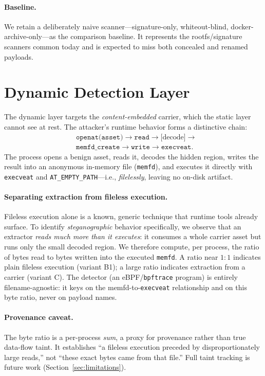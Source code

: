 \documentclass[sigconf,nonacm]{acmart}
\begin{document}
\paragraph{Baseline.} We retain a deliberately naive scanner---signature-only,
whiteout-blind, docker-archive-only---as the comparison baseline. It represents
the rootfs/signature scanners common today and is expected to miss both concealed
and renamed payloads.

\section{Dynamic Detection Layer}
\label{sec:dynamic}
The dynamic layer targets the \emph{content-embedded} carrier, which the static
layer cannot see at rest. The attacker's runtime behavior forms a distinctive
chain:
\[
\begin{aligned}
&\texttt{openat(asset)} \to \texttt{read} \to \text{[decode]} \to\\
&\texttt{memfd\_create} \to \texttt{write} \to \texttt{execveat}.
\end{aligned}
\]
The process opens a benign asset, reads it, decodes the hidden region, writes the
result into an anonymous in-memory file (\texttt{memfd}), and executes it directly
with \texttt{execveat} and \texttt{AT\_EMPTY\_PATH}---i.e., \emph{filelessly},
leaving no on-disk artifact.

\paragraph{Separating extraction from fileless execution.} Fileless execution
alone is a known, generic technique that runtime tools already surface. To
identify \emph{steganographic} behavior specifically, we observe that an extractor
\emph{reads much more than it executes}: it consumes a whole carrier asset but
runs only the small decoded region. We therefore compute, per process, the ratio
of bytes read to bytes written into the executed \texttt{memfd}. A ratio near
$1{:}1$ indicates plain fileless execution (variant B1); a large ratio indicates
extraction from a carrier (variant C). The detector (an eBPF/\texttt{bpftrace}
program) is entirely filename-agnostic: it keys on the memfd-to-\texttt{execveat}
relationship and on this byte ratio, never on payload names.

\paragraph{Provenance caveat.} The byte ratio is a per-process \emph{sum}, a proxy
for provenance rather than true data-flow taint. It establishes ``a fileless
execution preceded by disproportionately large reads,'' not ``these exact bytes
came from that file.'' Full taint tracking is future work
(Section~\ref{sec:limitations}).
\end{document}
